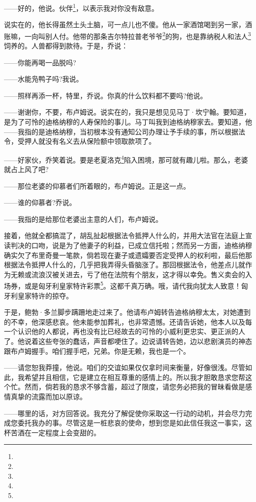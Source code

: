 \par ——好的，他说。伙伴\footnote{}，以表示我对你没有敌意。
\par 说实在的，他长得虽然土头土脑，可一点儿也不傻。他从一家酒馆喝到另一家，酒账嘛，一向叫别人付。他带的那条吉尔特拉普老爷爷\footnote{}的狗，也是靠纳税人和法人\footnote{}饲养的。人兽都得到款待。于是，乔说：
\par ——你能再喝一品脱吗?
\par ——水能凫鸭子吗?我说。
\par ——照样再添一杯，特里，乔说。你真的什么饮料都不要吗?他说。
\par ——谢谢你，不要，布卢姆说。说实在的，我只是想见见马丁·坎宁翰。要知道，是为了可怜的迪格纳穆的人寿保险的事儿。马丁叫我到迪格纳穆家去。要知道，他——我指的是迪格纳穆，当初根本没有通知公司办理让予手续的事，所以根据法令，受押人就没有名义去从保险额中领取款项了。
\par ——好家伙，乔笑着说。要是老夏洛克\footnote{}陷入困境，那可就有趣儿啦。那么，老婆就占上风了吧?
\par ——那位老婆的仰慕者们所着眼的，布卢姆说。正是这一点。
\par ——谁的仰慕者?乔说。
\par ——我指的是给那位老婆出主意的人们，布卢姆说。
\par 接着，他就全都搞混了，胡乱扯起根据法令抵押人什么的，并用大法官在法庭上宣读判决的口吻，说是为了他妻子的利益，已成立信托啦；然而另一方面，迪格纳穆确实欠了布里奇曼一笔款，倘若现在妻子或遗孀要否定受押人的权利啦，最后他那根据法令抵押人什么的，几乎把我弄得头昏脑涨了。那回根据法令，他差点儿就作为无赖或流浪汉被关进去，亏了他在法院有个朋友，这才得以幸免。售义卖会的入场券，或是匈牙利皇家特许彩票\footnote{}。这都千真万确。哦，请代我向犹太人致意！匈牙利皇家特许的掠夺。
\par 于是，鲍勃·多兰脚步蹒跚地走过来了。他请布卢姆转告迪格纳穆太太，对她遭到的不幸，他深感悲哀。他未能参加葬礼，也非常遗憾。还请告诉她，他本人以及每一个认识他的人都说，再也没有比已经故去的可怜的小威利更忠实、更正派的人了。他说着这些夸张的蠢话，声音都哽住了。边说请转告她，边以悲剧演员的神态跟布卢姆握手。咱们握手吧，兄弟。你是无赖，我也是一个。
\par ——请您恕我莽撞，他说。咱们的交谊如果仅仅拿时间来衡量，好像很浅。尽管如此，我希望并且相信，它是建立在相互尊重的感情上的。所以我才胆敢恳求您帮这个忙。然而，倘若我的恳求不够含蓄，超过了限度，请您务必把我的冒昧看做是感情真挚的流露而加以原谅。
\par ——哪里的话，对方回答说。我充分了解促使你采取这一行动的动机，并会尽力完成您委托我办的事。尽管这是一桩悲哀的使命，想到您是如此信任我这一事实，这杯苦酒在一定程度上会变甜的。
